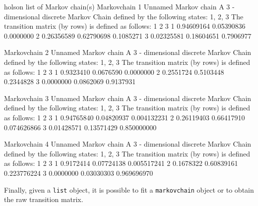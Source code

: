 \documentclass[article,nojss]{jss}
\begin{document}
\begin{CodeChunk}


\begin{CodeOutput}
holson  list of Markov chain(s) 
Markovchain  1 
Unnamed Markov chain 
 A  3 - dimensional discrete Markov Chain defined by the following states: 
 1, 2, 3 
 The transition matrix  (by rows)  is defined as follows: 
           1          2         3
1 0.94609164 0.05390836 0.0000000
2 0.26356589 0.62790698 0.1085271
3 0.02325581 0.18604651 0.7906977

Markovchain  2 
Unnamed Markov chain 
 A  3 - dimensional discrete Markov Chain defined by the following states: 
 1, 2, 3 
 The transition matrix  (by rows)  is defined as follows: 
          1         2         3
1 0.9323410 0.0676590 0.0000000
2 0.2551724 0.5103448 0.2344828
3 0.0000000 0.0862069 0.9137931

Markovchain  3 
Unnamed Markov chain 
 A  3 - dimensional discrete Markov Chain defined by the following states: 
 1, 2, 3 
 The transition matrix  (by rows)  is defined as follows: 
           1          2           3
1 0.94765840 0.04820937 0.004132231
2 0.26119403 0.66417910 0.074626866
3 0.01428571 0.13571429 0.850000000

Markovchain  4 
Unnamed Markov chain 
 A  3 - dimensional discrete Markov Chain defined by the following states: 
 1, 2, 3 
 The transition matrix  (by rows)  is defined as follows: 
          1          2           3
1 0.9172414 0.07724138 0.005517241
2 0.1678322 0.60839161 0.223776224
3 0.0000000 0.03030303 0.969696970
\end{CodeOutput}
\end{CodeChunk}

Finally, given a \texttt{list} object, it is possible to fit a \texttt{markovchain} object or to obtain the raw transition matrix.
\end{document}

